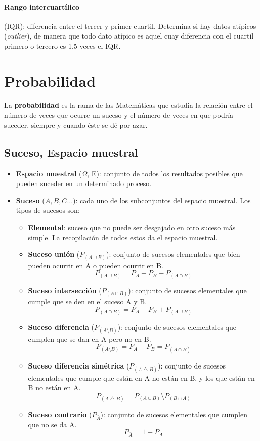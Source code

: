 \paragraph{Rango intercuartílico} (IQR): diferencia entre el tercer y primer cuartil. Determina si hay datos atípicos (\textit{outlier}), de manera que todo dato atípico es aquel cuay diferencia con el cuartil primero o tercero es 1.5 veces el IQR.
\section{Probabilidad}
La \textbf{probabilidad} es la rama de las Matemáticas que estudia la relación entre el número de veces que ocurre un suceso y el número de veces en que podría suceder, siempre y cuando éste se dé por azar.
\subsection{Suceso, Espacio muestral}
\begin{itemize}[itemsep=0pt,parsep=0pt,topsep=0pt,partopsep=0pt]
    \item \textbf{Espacio muestral} ($\Omega$, E): conjunto de todos los resultados posibles que pueden suceder en un determinado proceso.
    \item\textbf{Suceso} ($A, B, C \dots$): cada uno de los subconjuntos del espacio muestral. Los tipos de sucesos son:
    \begin{itemize}[itemsep=0pt,parsep=0pt,topsep=0pt,partopsep=0pt]
        \item \textbf{Elemental}:  suceso que no puede ser desgajado en otro suceso más simple. La recopilación de todos estos da el espacio muestral.
        \item\textbf{Suceso unión} ($P_{\left( A\cup B\right) }$): conjunto de sucesos elementales que bien pueden ocurrir en A o pueden ocurrir en B.
            \[ P_{\left( A\cup B\right) } = P_A + P_B  -P_{\left( A\cap B\right) }\]
        \item\textbf{Suceso intersección} ($P_{\left( A \cap B\right) }$): conjunto de sucesos elementales que cumple que se den en el suceso A y B.
             \[ P_{\left( A\cap B\right) } = P_A - P_B + P_{\left( A\cup B\right) } \]
         \item\textbf{Suceso diferencia} ($P_{\left( A\setminus B\right) }$): conjunto de sucesos elementales que cumplen que se dan en A pero no en B.
            \[ P_{\left( A\setminus B\right) } = P_A - P_B = P_{\left( A\cap \bar{B}\right) } \]
        \item\textbf{Suceso diferencia simétrica} ($P_{\left( A\bigtriangleup B\right) }$): conjunto de sucesos elementales que cumple que están en A no están en B, y los que están en B no están en A.
            \[ P_{\left( A\bigtriangleup B\right) } = P_{\left( A\cup B\right) }\setminus P_{\left( B\cap A\right) } \]
        \item\textbf{Suceso contrario} ($P_{\bar{A}}$): conjunto de sucesos elementales que cumplen que no se da A.
            \[ P_{\bar{A}} = 1- P_A \]
    \end{itemize}
\end{itemize}
